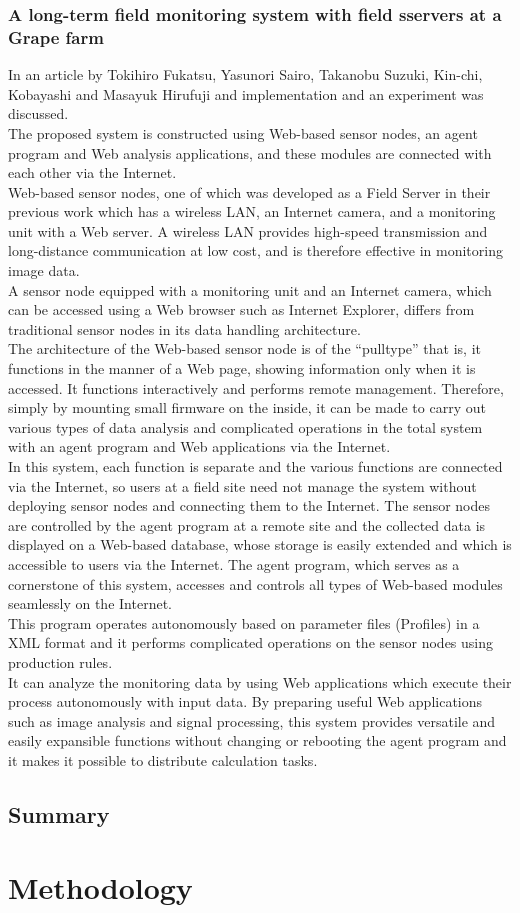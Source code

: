 \documentclass[12pt, a4paper]{article}
\begin{document}
\subsubsection{A long-term field monitoring system with field sservers at a Grape farm}
In an article by Tokihiro Fukatsu, Yasunori Sairo, Takanobu Suzuki, Kin-chi, Kobayashi and Masayuk Hirufuji and  implementation and an experiment was discussed.\\
The proposed system is constructed using Web-based sensor nodes, an agent program and Web analysis applications, and these modules are connected with each other via the Internet.\\ 
Web-based sensor nodes, one of which was developed as a Field Server in their previous work which has a wireless LAN, an Internet camera, and a monitoring unit with a Web server. A wireless LAN provides high-speed transmission and long-distance communication at low cost, and is therefore effective in monitoring image data.\\
A sensor node equipped with a monitoring unit and an Internet camera, which can be accessed using a Web browser such as Internet Explorer, differs from traditional sensor nodes in its data handling architecture.\\
 The architecture of the Web-based sensor node is of the “pulltype” that is, it functions in the manner of a Web page, showing information only when it is accessed. It functions interactively and performs remote management. Therefore, simply by mounting small firmware on the inside, it can be made to carry out various types of data analysis and complicated operations in the
total system with an agent program and Web applications via the Internet.\\
In this system, each function is separate and the various functions are connected via the Internet, so users at a field site need not manage the system without deploying sensor nodes and connecting them to the Internet. The sensor nodes are controlled by the agent program at a remote site and the collected data is displayed on a Web-based database, whose storage is easily extended and which is accessible to users via the Internet. The agent program, which serves as a cornerstone of this system, accesses and controls all types of Web-based modules seamlessly on the Internet.\\ 
This program operates autonomously based on parameter files (Profiles) in a XML format and it performs complicated operations on the sensor nodes using production rules.\\
It can analyze the monitoring data by using Web applications which execute their process autonomously with input data. By preparing useful Web applications such as image analysis and signal processing, this system provides versatile and easily expansible functions without changing or rebooting the agent program and it makes it possible to distribute calculation tasks.
\subsection{Summary}
\newpage

\section{Methodology}
\end{document}
